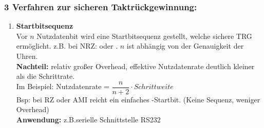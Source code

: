 \documentclass[10pt,a4paper]{scrartcl}
\begin{document}
\subsubsection*{3 Verfahren zur sicheren Taktrückgewinnung:}
\begin{enumerate}
	\item \textbf{Startbitsequenz} \\
	Vor $n$ Nutzdatenbit wird eine Startbitsequenz gestellt, welche sichere \ac{TRG} ermöglicht. z.B. bei \ac{NRZ}: \grqq oder  \grqq. $n$ ist abhängig von der Genauigkeit der Uhren. \\
	\textbf{Nachteil:} relativ großer Overhead, effektive Nutzdatenrate deutlich kleiner als die Schrittrate.\\
	\noindent\hspace*{2em}%
	Im Beispiel: Nutzdatenrate = $\dfrac{n}{n+2}\cdot Schrittweite$\\
	Bsp: bei \ac{RZ} oder \ac{AMI} reicht ein einfaches  \grqq-Startbit. (Keine \glqq Sequenz\grqq, weniger Overhead)\\
	\textbf{Anwendung:} z.B.serielle Schnittstelle RS232
	

\end{enumerate}
\end{document}
